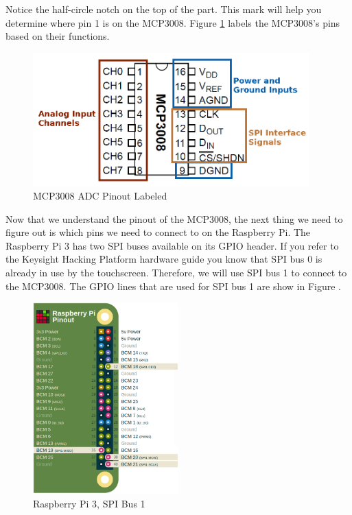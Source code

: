 \documentclass{article}
\begin{document}
Notice the half-circle notch on the top of the part. This mark will help you determine where pin 1 is on the MCP3008. Figure \ref{MCP3008_pinout_labeled} labels the MCP3008's pins based on their functions.


	\begin{figure}[H]
		\centering
		\includegraphics[width=0.95\textwidth]{pics/MCP3008_pinout_labeled.png}
		\caption{MCP3008 ADC Pinout Labeled}
		\label{MCP3008_pinout_labeled}
	\end{figure}


Now that we understand the pinout of the MCP3008, the next thing we need to figure out is which pins we need to connect to on the Raspberry Pi. The Raspberry Pi 3 has two SPI buses available on its GPIO header. If you refer to the Keysight Hacking Platform hardware guide you know that SPI bus 0 is already in use by the touchscreen. Therefore, we will use SPI bus 1 to connect to the MCP3008. The GPIO lines that are used for SPI bus 1 are show in Figure .

	\begin{figure}[H]
		\centering
		\includegraphics[width=0.5\textwidth]{pics/SPI_Bus1_CS0.png}
		\caption{Raspberry Pi 3, SPI Bus 1}
		\label{SPI_Bus1}
	\end{figure}
\end{document}
